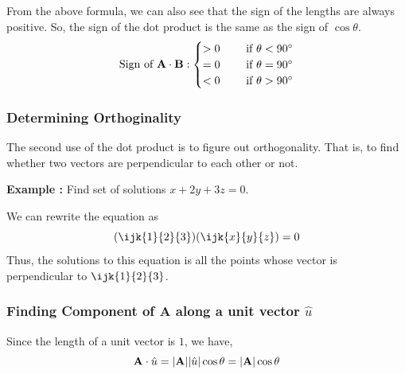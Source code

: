 From the above formula, we can also see that the sign of the lengths are always positive.
So, the sign of the dot product is the same as the sign of $\cos \theta$. 
$$
\text{Sign of } {\bf A} \cdot {\bf B} : 
    \begin{cases}
        > 0 & \quad \text{ if } \theta < 90^{\circ} \\
        = 0 & \quad \text{ if } \theta = 90^{\circ} \\
        < 0 & \quad \text{ if } \theta > 90^{\circ}
    \end{cases}  
$$

\subsubsection{Determining Orthoginality}

The second use of the dot product is to figure out orthogonality. 
That is, to find whether two vectors are perpendicular to each other or not.

{\bf Example : } Find set of solutions $x + 2y + 3z = 0$.


We can rewrite the equation as $$ (\ijk{1}{2}{3})(\ijk{x}{y}{z}) = 0 $$
Thus, the solutions to this equation is all the points whose vector is perpendicular to $\ijk{1}{2}{3}$.


\subsubsection{Finding Component of {\bf A} along a unit vector $\hat{u}$}

Since the length of a unit vector is $1$, we have,
$$ {\bf A} \cdot \hat{u} = |{\bf A}||\hat{u}| \cos \theta = |{\bf A}|\cos \theta $$